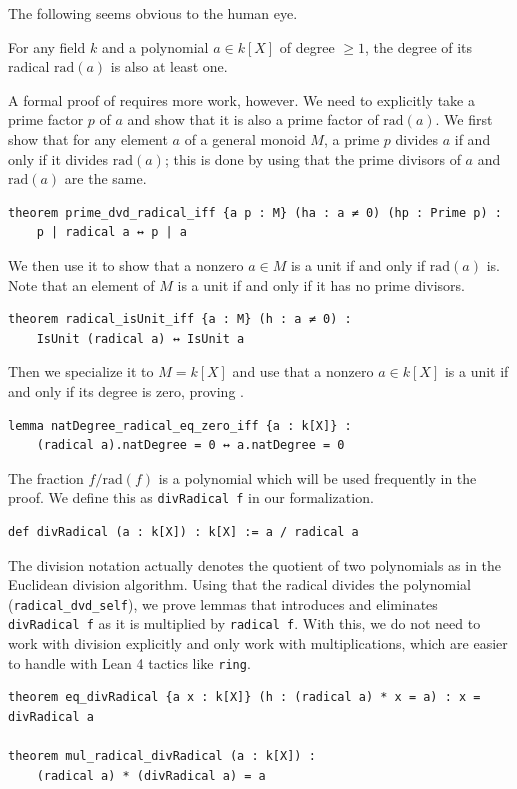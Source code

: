\documentclass[runningheads]{llncs}
\newcommand{\rad}{\mathrm{rad}}
\begin{document}
The following seems obvious to the human eye.
\begin{lemma}
\label{lem:nzdeg}
For any field $k$ and a polynomial $a \in k[X]$ of degree $\geq 1$, the degree of its radical $\rad(a)$ is also at least one.
\end{lemma}
A formal proof of  requires more work, however. We need to explicitly take a prime factor $p$ of $a$ and show that it is also a prime factor of $\rad(a)$.
We first show that for any element $a$ of a general monoid $M$, a prime $p$ divides $a$ if and only if it divides $\rad(a)$; this is done by using that the prime divisors of $a$ and $\rad(a)$ are the same.
\begin{verbatim}
theorem prime_dvd_radical_iff {a p : M} (ha : a ≠ 0) (hp : Prime p) :
    p | radical a ↔ p | a
\end{verbatim}
We then use it to show that a nonzero $a \in M$ is a unit if and only if $\rad(a)$ is. Note that an element of $M$ is a unit if and only if it has no prime divisors.
\begin{verbatim}
theorem radical_isUnit_iff {a : M} (h : a ≠ 0) :
    IsUnit (radical a) ↔ IsUnit a
\end{verbatim}
Then we specialize it to $M = k[X]$ and use that a nonzero $a \in k[X]$ is a unit if and only if its degree is zero, proving .
\begin{verbatim}
lemma natDegree_radical_eq_zero_iff {a : k[X]} :
    (radical a).natDegree = 0 ↔ a.natDegree = 0
\end{verbatim}

The fraction $f / \rad (f)$ is a polynomial which will be used frequently in the proof. We define this as \texttt{divRadical f} in our formalization.

\begin{verbatim}
def divRadical (a : k[X]) : k[X] := a / radical a
\end{verbatim}
The division notation actually denotes the quotient of two polynomials as in the Euclidean division algorithm. 
Using that the radical divides the polynomial (\texttt{radical\_dvd\_self}), we prove lemmas that introduces and eliminates \texttt{divRadical f} as it is multiplied by \texttt{radical f}.
With this, we do not need to work with division explicitly and only work with multiplications, which are easier to handle with Lean 4 tactics like \texttt{ring}.

\begin{verbatim}
theorem eq_divRadical {a x : k[X]} (h : (radical a) * x = a) : x = divRadical a

theorem mul_radical_divRadical (a : k[X]) :
    (radical a) * (divRadical a) = a
\end{verbatim}
\end{document}
